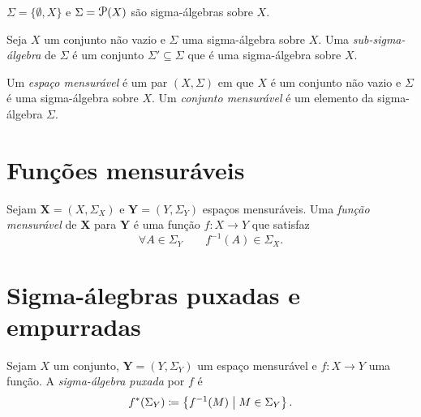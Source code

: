 \begin{ex}
	$\Sigma = \{\emptyset,X\}$ e $\Sigma = \p(X)$ são sigma-álgebras sobre $X$.
\end{ex}

\begin{defi}
	Seja $X$ um conjunto não vazio e $\Sigma$ uma sigma-álgebra sobre $X$. Uma \emph{sub-sigma-álgebra} de $\Sigma$ é um conjunto $\Sigma' \subseteq \Sigma$ que é uma sigma-álgebra sobre $X$.
\end{defi}

\begin{defi}
	Um \emph{espaço mensurável} é um par $(X,\Sigma)$ em que $X$ é um conjunto não vazio e $\Sigma$ é uma sigma-álgebra sobre $X$. Um \emph{conjunto mensurável} é um elemento da sigma-álgebra $\Sigma$.
\end{defi}

\section{Funções mensuráveis}

\begin{defi}
Sejam $\bm X = (X,\Sigma_X)$ e $\bm Y = (Y,\Sigma_Y)$ espaços mensuráveis. Uma \emph{função mensurável} de $\bm X$ para $\bm Y$ é uma função $f: X \to Y$ que satisfaz
	\begin{equation*}
	\forall A \in \Sigma_Y \qquad f^{-1}(A) \in \Sigma_X.
	\end{equation*}
\end{defi}

\section{Sigma-álegbras puxadas e empurradas}

\begin{defi}
Sejam $X$ um conjunto, $\bm Y = (Y,\Sigma_Y)$ um espaço mensurável e $f: X \to Y$ uma função. A \emph{sigma-álgebra puxada} por $f$ é
	\begin{equation*}
	f^*(\Sigma_Y) \coloneqq \set{f^{-1}(M)}{M \in \Sigma_Y}.
	\end{equation*}
\end{defi}

